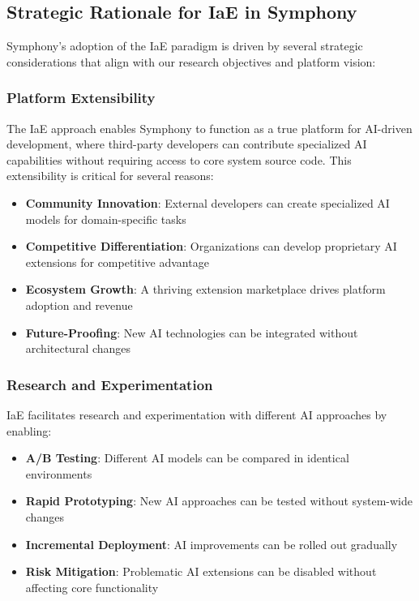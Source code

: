 \subsection{Strategic Rationale for IaE in Symphony}

Symphony's adoption of the IaE paradigm is driven by several strategic considerations that align with our research objectives and platform vision:

\subsubsection{Platform Extensibility}

The IaE approach enables Symphony to function as a true platform for AI-driven development, where third-party developers can contribute specialized AI capabilities without requiring access to core system source code. This extensibility is critical for several reasons:

\begin{itemize}
    \item \textbf{Community Innovation}: External developers can create specialized AI models for domain-specific tasks
    \item \textbf{Competitive Differentiation}: Organizations can develop proprietary AI extensions for competitive advantage
    \item \textbf{Ecosystem Growth}: A thriving extension marketplace drives platform adoption and revenue
    \item \textbf{Future-Proofing}: New AI technologies can be integrated without architectural changes
\end{itemize}

\subsubsection{Research and Experimentation}

IaE facilitates research and experimentation with different AI approaches by enabling:

\begin{itemize}
    \item \textbf{A/B Testing}: Different AI models can be compared in identical environments
    \item \textbf{Rapid Prototyping}: New AI approaches can be tested without system-wide changes
    \item \textbf{Incremental Deployment}: AI improvements can be rolled out gradually
    \item \textbf{Risk Mitigation}: Problematic AI extensions can be disabled without affecting core functionality
\end{itemize}

